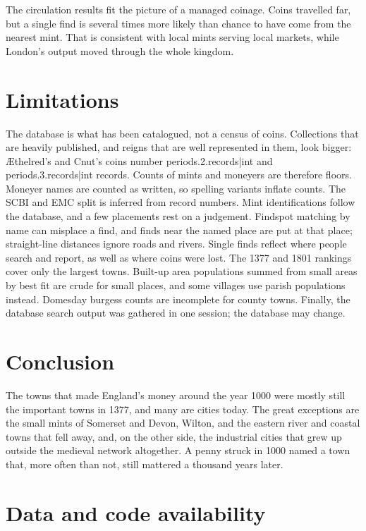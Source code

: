 \documentclass[11pt,a4paper]{article}
\begin{document}
The circulation results fit the picture of a managed coinage. Coins travelled far, but a single find is several times more likely than chance to have come from the nearest mint. That is consistent with local mints serving local markets, while London's output moved through the whole kingdom.

\section{Limitations}

The database is what has been catalogued, not a census of coins. Collections that are heavily published, and reigns that are well represented in them, look bigger: Æthelred's and Cnut's coins number {{periods.2.records|int}} and {{periods.3.records|int}} records. Counts of mints and moneyers are therefore floors. Moneyer names are counted as written, so spelling variants inflate counts. The SCBI and EMC split is inferred from record numbers. Mint identifications follow the database, and a few placements rest on a judgement. Findspot matching by name can misplace a find, and finds near the named place are put at that place; straight-line distances ignore roads and rivers. Single finds reflect where people search and report, as well as where coins were lost. The 1377 and 1801 rankings cover only the largest towns. Built-up area populations summed from small areas by best fit are crude for small places, and some villages use parish populations instead. Domesday burgess counts are incomplete for county towns. Finally, the database search output was gathered in one session; the database may change.

\section{Conclusion}

The towns that made England's money around the year 1000 were mostly still the important towns in 1377, and many are cities today. The great exceptions are the small mints of Somerset and Devon, Wilton, and the eastern river and coastal towns that fell away, and, on the other side, the industrial cities that grew up outside the medieval network altogether. A penny struck in 1000 named a town that, more often than not, still mattered a thousand years later.

\section*{Data and code availability}
\end{document}

